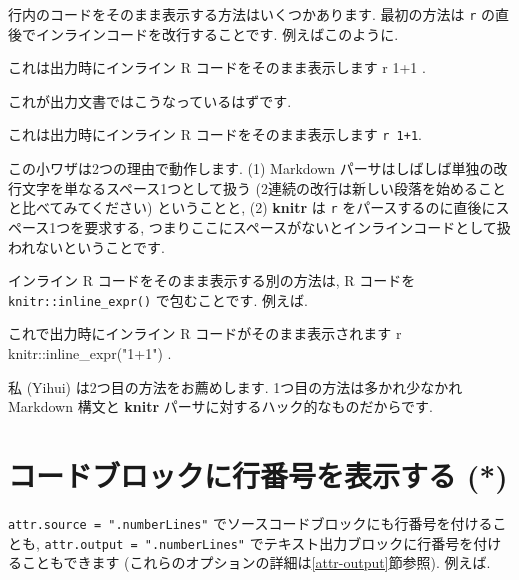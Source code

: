 \documentclass[
  11pt,
  lualatex,ja=standard,jafont=noto]{bxjsreport}
\newenvironment{Shaded}{\begin{snugshade}}{\end{snugshade}}
\newcommand{\InformationTok}[1]{\textcolor[rgb]{0.56,0.35,0.01}{\textbf{\textit{#1}}}}
\newcommand{\NormalTok}[1]{#1}
\renewenvironment{quote}{\def\FrameCommand{{\color{quotebarcolor}{\vrule width 3pt}}\hspace{10pt}}\MakeFramed{\advance\hsize-\width\FrameRestore}}{\endMakeFramed}
\begin{document}
行内のコードをそのまま表示する方法はいくつかあります. 最初の方法は \texttt{\textasciigrave{}r} の直後でインラインコードを改行することです. 例えばこのように.

\begin{Shaded}
\begin{Highlighting}[]
\NormalTok{これは出力時にインライン R コードをそのまま表示します \textasciigrave{}}\InformationTok{\textasciigrave{} \textasciigrave{}}\NormalTok{r}
\NormalTok{1+1\textasciigrave{} \textasciigrave{}\textasciigrave{}.}
\end{Highlighting}
\end{Shaded}

これが出力文書ではこうなっているはずです.

\begin{quote}
これは出力時にインライン R コードをそのまま表示します \texttt{\textasciigrave{}r\ 1+1\textasciigrave{}}.
\end{quote}

この小ワザは2つの理由で動作します. (1) Markdown パーサはしばしば単独の改行文字を単なるスペース1つとして扱う (2連続の改行は新しい段落を始めることと比べてみてください) ということと, (2) \textbf{knitr} は \texttt{\textasciigrave{}r} をパースするのに直後にスペース1つを要求する, つまりここにスペースがないとインラインコードとして扱われないということです.

インライン R コードをそのまま表示する別の方法は, R コードを \texttt{knitr::inline\_expr()} で包むことです. 例えば.

\begin{Shaded}
\begin{Highlighting}[]
\NormalTok{これで出力時にインライン R コードがそのまま表示されます}
\NormalTok{\textasciigrave{}}\InformationTok{\textasciigrave{} \textasciigrave{}}\NormalTok{r knitr::inline\_expr("1+1")\textasciigrave{} \textasciigrave{}\textasciigrave{}.}
\end{Highlighting}
\end{Shaded}

私 (Yihui) は2つ目の方法をお薦めします. 1つ目の方法は多かれ少なかれ Markdown 構文と \textbf{knitr} パーサに対するハック的なものだからです.

\hypertarget{number-lines}{%
\section{コードブロックに行番号を表示する (*)}\label{number-lines}}

\texttt{attr.source = ".numberLines"} でソースコードブロックにも行番号を付けることも, \texttt{attr.output = ".numberLines"} でテキスト出力ブロックに行番号を付けることもできます (これらのオプションの詳細は\ref{attr-output}節参照). 例えば.
\end{document}
